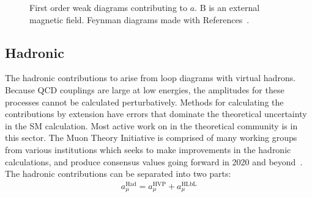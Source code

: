 \begin{figure}
\caption[Electroweak diagrams contributing to the magnetic moment]{First order weak diagrams contributing to $a$. B is an external magnetic field. Feynman diagrams made with References~\cite{tikz-feynman,tikz-feynhand}.}	
\label{fig:EWDiagrams}
\end{figure}


\subsection{Hadronic}
\label{subsec:Hadronic}

The hadronic contributions to \amu arise from loop diagrams with virtual hadrons. Because QCD couplings are large at low energies, the amplitudes for these processes cannot be calculated perturbatively. Methods for calculating the contributions by extension have errors that dominate the theoretical uncertainty in the SM calculation. Most active work on \amu in the theoretical community is in this sector. The Muon \gmtwo Theory Initiative is comprised of many working groups from various institutions which seeks to make improvements in the hadronic calculations, and produce consensus values going forward in 2020 and beyond~\cite{TheoryInitiative}. The hadronic contributions can be separated into two parts:
		\begin{align}
            a_{\mu}^{\text{Had}} = a_{\mu}^{\text{HVP}} + a_{\mu}^{\text{HLbL}}
        \label{eq:HadSplit}
		\end{align}


